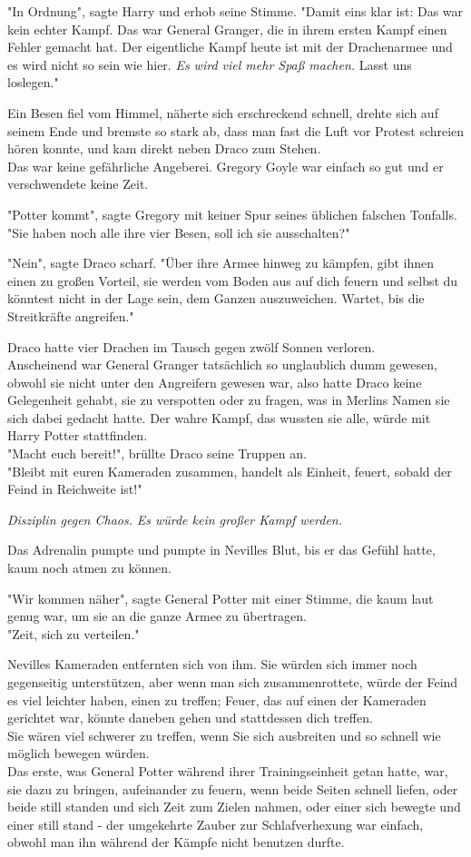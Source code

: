 {"In Ordnung", sagte Harry und erhob seine Stimme. "Damit eins klar ist: Das war kein echter Kampf. Das war General Granger, die in ihrem ersten Kampf einen Fehler gemacht hat. Der eigentliche Kampf heute ist mit der Drachenarmee und es wird nicht so sein wie hier. \emph{Es wird viel mehr Spaß machen.} Lasst uns loslegen."

Ein Besen fiel vom Himmel, näherte sich erschreckend schnell, drehte sich auf seinem Ende und bremste so stark ab, dass man fast die Luft vor Protest schreien hören konnte, und kam direkt neben Draco zum Stehen.\\ Das war keine gefährliche Angeberei. Gregory Goyle war einfach so gut und er verschwendete keine Zeit.

"Potter kommt", sagte Gregory mit keiner Spur seines üblichen falschen Tonfalls.\\ "Sie haben noch alle ihre vier Besen, soll ich sie ausschalten?"

"Nein", sagte Draco scharf. "Über ihre Armee hinweg zu kämpfen, gibt ihnen einen zu großen Vorteil, sie werden vom Boden aus auf dich feuern und selbst du könntest nicht in der Lage sein, dem Ganzen auszuweichen. Wartet, bis die Streitkräfte angreifen."

Draco hatte vier Drachen im Tausch gegen zwölf Sonnen verloren.\\ Anscheinend war General Granger tatsächlich so unglaublich dumm gewesen, obwohl sie nicht unter den Angreifern gewesen war, also hatte Draco keine Gelegenheit gehabt, sie zu verspotten oder zu fragen, was in Merlins Namen sie sich dabei gedacht hatte. Der wahre Kampf, das wussten sie alle, würde mit Harry Potter stattfinden.\\ "Macht euch bereit!", brüllte Draco seine Truppen an.\\ "Bleibt mit euren Kameraden zusammen, handelt als Einheit, feuert, sobald der Feind in Reichweite ist!"

\emph{Disziplin gegen Chaos.} \emph{Es würde kein großer Kampf werden.}

Das Adrenalin pumpte und pumpte in Nevilles Blut, bis er das Gefühl hatte, kaum noch atmen zu können.

"Wir kommen näher", sagte General Potter mit einer Stimme, die kaum laut genug war, um sie an die ganze Armee zu übertragen.\\ "Zeit, sich zu verteilen."

Nevilles Kameraden entfernten sich von ihm. Sie würden sich immer noch gegenseitig unterstützen, aber wenn man sich zusammenrottete, würde der Feind es viel leichter haben, einen zu treffen; Feuer, das auf einen der Kameraden gerichtet war, könnte daneben gehen und stattdessen dich treffen.\\ Sie wären viel schwerer zu treffen, wenn Sie sich ausbreiten und so schnell wie möglich bewegen würden.\\ Das erste, was General Potter während ihrer Trainingseinheit getan hatte, war, sie dazu zu bringen, aufeinander zu feuern, wenn beide Seiten schnell liefen, oder beide still standen und sich Zeit zum Zielen nahmen, oder einer sich bewegte und einer still stand - der umgekehrte Zauber zur Schlafverhexung war einfach, obwohl man ihn während der Kämpfe nicht benutzen durfte.

}
